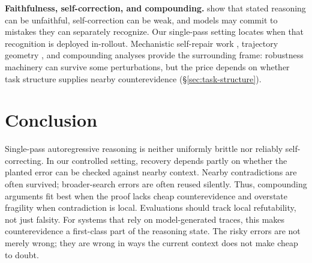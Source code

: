 \documentclass{article}
\begin{document}
\textbf{Faithfulness, self-correction, and compounding.}
\citet{lanham2023measuring,turpin2023unfaithful,zhang2023snowball,huang2024cannot}
show that stated reasoning can be unfaithful, self-correction can be weak, and models
may commit to mistakes they can separately recognize. Our single-pass setting locates
when that recognition is deployed in-rollout. Mechanistic self-repair work
\citep{mcgrath2023hydra,lad2024stages}, trajectory geometry
\citep{sun2026trajectories}, and compounding analyses \citep{dziri2023faith} provide
the surrounding frame: robustness machinery can survive some perturbations, but the
price depends on whether task structure supplies nearby counterevidence
(\S\ref{sec:task-structure}).

\section{Conclusion}
Single-pass autoregressive reasoning is neither uniformly brittle nor reliably
self-correcting. In our controlled setting, recovery depends partly on whether the
planted error can be checked against nearby context. Nearby contradictions are often
survived; broader-search errors are often reused silently. Thus, compounding arguments
fit best when the proof lacks cheap counterevidence and overstate fragility when
contradiction is local. Evaluations should track local refutability, not just falsity.
For systems that rely on model-generated traces, this makes counterevidence a
first-class part of the reasoning state. The risky errors are not merely wrong; they
are wrong in ways the current context does not make cheap to doubt.
\end{document}
